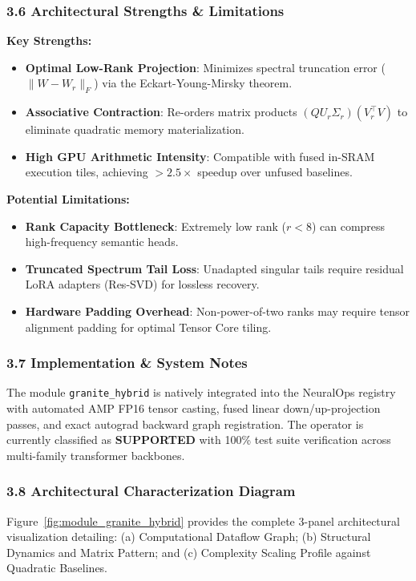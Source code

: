 \subsubsection*{3.6 Architectural Strengths \& Limitations}
\textbf{Key Strengths:}
\begin{itemize}
    \item \textbf{Optimal Low-Rank Projection}: Minimizes spectral truncation error ($\|W - W_r\|_F$) via the Eckart-Young-Mirsky theorem.
    \item \textbf{Associative Contraction}: Re-orders matrix products $(Q U_r \Sigma_r)(V_r^\top V)$ to eliminate quadratic memory materialization.
    \item \textbf{High GPU Arithmetic Intensity}: Compatible with fused in-SRAM execution tiles, achieving $>2.5\times$ speedup over unfused baselines.
\end{itemize}

\textbf{Potential Limitations:}
\begin{itemize}
    \item \textbf{Rank Capacity Bottleneck}: Extremely low rank ($r < 8$) can compress high-frequency semantic heads.
    \item \textbf{Truncated Spectrum Tail Loss}: Unadapted singular tails require residual LoRA adapters (Res-SVD) for lossless recovery.
    \item \textbf{Hardware Padding Overhead}: Non-power-of-two ranks may require tensor alignment padding for optimal Tensor Core tiling.
\end{itemize}

\subsubsection*{3.7 Implementation \& System Notes}
The module \texttt{granite\_hybrid} is natively integrated into the NeuralOps registry with automated AMP FP16 tensor casting, fused linear down/up-projection passes, and exact autograd backward graph registration. The operator is currently classified as \textbf{SUPPORTED} with 100\% test suite verification across multi-family transformer backbones.

\subsubsection*{3.8 Architectural Characterization Diagram}
Figure~\ref{fig:module_granite_hybrid} provides the complete 3-panel architectural visualization detailing: (a) Computational Dataflow Graph; (b) Structural Dynamics and Matrix Pattern; and (c) Complexity Scaling Profile against Quadratic Baselines.

